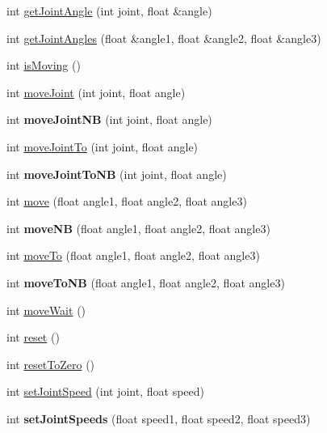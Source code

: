 \begin{DoxyCompactItemize}
\item 
int \hyperlink{classLinkbot_ac9a176a56a1df4dc9960b1cfb17b6d7b}{get\-Joint\-Angle} (int joint, float \&angle)
\item 
int \hyperlink{classLinkbot_a73cc50fbf7ec3bad03661bed448e4849}{get\-Joint\-Angles} (float \&angle1, float \&angle2, float \&angle3)
\item 
int \hyperlink{classLinkbot_a0f78aff251e2241b10241e2588bb34c4}{is\-Moving} ()
\item 
int \hyperlink{classLinkbot_a32ad188a0427ecabcceff02c4b63a80b}{move\-Joint} (int joint, float angle)
\item 
\hypertarget{classLinkbot_ae60fd0c92b13a0db72b053d5ad040ac0}{int {\bfseries move\-Joint\-N\-B} (int joint, float angle)}\label{classLinkbot_ae60fd0c92b13a0db72b053d5ad040ac0}

\item 
int \hyperlink{classLinkbot_a1488fe383afc49377ed902aece2aa6d2}{move\-Joint\-To} (int joint, float angle)
\item 
\hypertarget{classLinkbot_a8f61b5e86a13713a94b88da3e3d17c5e}{int {\bfseries move\-Joint\-To\-N\-B} (int joint, float angle)}\label{classLinkbot_a8f61b5e86a13713a94b88da3e3d17c5e}

\item 
int \hyperlink{classLinkbot_ac804deeebf250faab2a7d1b26f1343dd}{move} (float angle1, float angle2, float angle3)
\item 
\hypertarget{classLinkbot_a8e9f837893df015ee0c0f4c2d8578fa3}{int {\bfseries move\-N\-B} (float angle1, float angle2, float angle3)}\label{classLinkbot_a8e9f837893df015ee0c0f4c2d8578fa3}

\item 
int \hyperlink{classLinkbot_a2ef96f3c3b064564574485386682c42d}{move\-To} (float angle1, float angle2, float angle3)
\item 
\hypertarget{classLinkbot_a64c9add9758e5dd05e078f298b3fa4f1}{int {\bfseries move\-To\-N\-B} (float angle1, float angle2, float angle3)}\label{classLinkbot_a64c9add9758e5dd05e078f298b3fa4f1}

\item 
int \hyperlink{classLinkbot_aa11c2061cc30c4029a604c9a3b306fe1}{move\-Wait} ()
\item 
int \hyperlink{classLinkbot_ab01809ba0e6690ce4f72fef6f8606377}{reset} ()
\item 
int \hyperlink{classLinkbot_a492e961600d3730cd13eb58e8e2af628}{reset\-To\-Zero} ()
\item 
int \hyperlink{classLinkbot_a2fc98716f15c1a0b68825cab11216d7c}{set\-Joint\-Speed} (int joint, float speed)
\item 
\hypertarget{classLinkbot_a40fa5fba07706fedea9e9a79978c8c02}{int {\bfseries set\-Joint\-Speeds} (float speed1, float speed2, float speed3)}\label{classLinkbot_a40fa5fba07706fedea9e9a79978c8c02}


\end{DoxyCompactItemize}
